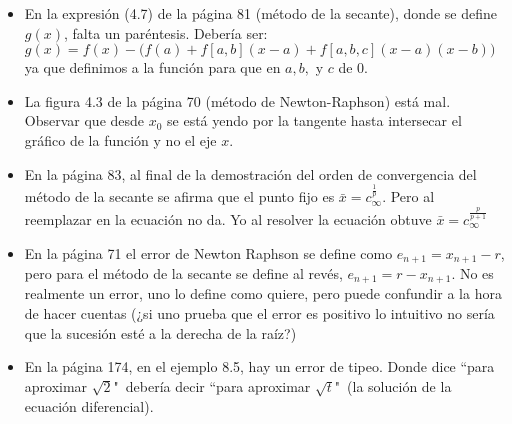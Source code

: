 \documentclass[10pt,a4paper,final]{report}
\begin{document}
\begin{itemize}
	\item En la expresión (4.7) de la página 81 (método de la secante), donde se define $g(x)$, falta un paréntesis. Debería ser:
$g(x) = f(x) - \Bigg(f(a) + f[a,b] (x-a) + f[a,b,c] (x-a) (x-b)\Bigg)$ ya que definimos a la función para que en $a,b,$ y $c$ de $0$.
	\item La figura 4.3 de la página 70 (método de Newton-Raphson) está mal. Observar que desde $x_0$ se está yendo por la tangente hasta intersecar el gráfico de la función y no el eje $x$.
	 \item En la página 83, al final de la demostración del orden de convergencia del método de la secante se afirma que el punto fijo es $\bar{x} = c_\infty^\frac{1}{p}$. Pero al reemplazar en la ecuación no da. Yo al resolver la ecuación obtuve $\bar{x}= c_\infty^{\frac{p}{p+1}}$
	\item En la página 71 el error de Newton Raphson se define como $e_{n+1} = x_{n+1} -r$, pero para el método de la secante se define al revés, $e_{n+1} = r - x_{n+1}$. No es realmente un error, uno lo define como quiere, pero puede confundir a la hora de hacer cuentas (¿si uno prueba que el error es positivo lo intuitivo no sería que la sucesión esté a la derecha de la raíz?)
	\item En la página 174, en el ejemplo 8.5, hay un error de tipeo. Donde dice ``para aproximar $\sqrt{2}$"\ debería decir ``para aproximar $\sqrt{t}$"\ (la solución de la ecuación diferencial).
\end{itemize}
\end{document}

